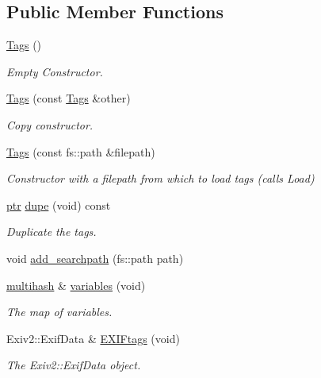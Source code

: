 \subsection*{Public Member Functions}
\begin{DoxyCompactItemize}
\item 
\hyperlink{class_photo_finish_1_1_tags_a3f2c0bcd42972aa25fed0e04d89493f1}{Tags} ()
\begin{DoxyCompactList}\small\item\em Empty Constructor. \end{DoxyCompactList}\item 
\hyperlink{class_photo_finish_1_1_tags_a9db994b3c40c2e4e1a92b0e7ca97ea18}{Tags} (const \hyperlink{class_photo_finish_1_1_tags}{Tags} \&other)
\begin{DoxyCompactList}\small\item\em Copy constructor. \end{DoxyCompactList}\item 
\hyperlink{class_photo_finish_1_1_tags_ae65e11953c2edea6dd987f476ee50f76}{Tags} (const fs\+::path \&filepath)
\begin{DoxyCompactList}\small\item\em Constructor with a filepath from which to load tags (calls Load) \end{DoxyCompactList}\item 
\hyperlink{class_photo_finish_1_1_tags_a3f9b01990d51bb4f4e5086182a8ddcf9}{ptr} \hyperlink{class_photo_finish_1_1_tags_a6e3beb9b058d670e1fda67ebc4181d05}{dupe} (void) const
\begin{DoxyCompactList}\small\item\em Duplicate the tags. \end{DoxyCompactList}\item 
void \hyperlink{class_photo_finish_1_1_tags_a643e1af1ed57a5cd8ad483ccbed1c190}{add\+\_\+searchpath} (fs\+::path path)
\item 
\hyperlink{namespace_photo_finish_a6f41796f162687538b7da5c7a95e2d18}{multihash} \& \hyperlink{class_photo_finish_1_1_tags_a22f5d1f5401c064f8a0ba3a41cd5c1d0}{variables} (void)
\begin{DoxyCompactList}\small\item\em The map of variables. \end{DoxyCompactList}\item 
Exiv2\+::\+Exif\+Data \& \hyperlink{class_photo_finish_1_1_tags_a27c18af86d774db3c8f741e2f6db380b}{E\+X\+I\+Ftags} (void)
\begin{DoxyCompactList}\small\item\em The Exiv2\+::\+Exif\+Data object. \end{DoxyCompactList}\item 

\end{DoxyCompactItemize}
